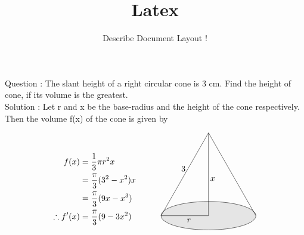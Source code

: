 \documentclass{beamer}
\title{Latex}
\subtitle{Describe Document Layout !}
\begin{document}
 


\frame {
		\titlepage
	}












\frame
{
\section{ }
Question : The slant height of a right circular cone is 3 cm. Find the height of cone, if its volume is the greatest.\\
\vspace{0.4cm}
Solution : Let  r  and x  be the base-radius and the height of the cone respectively. Then the volume f(x) of the cone is given by

\begin{equation} \nonumber
\begin{alignedat}{4}
f(x) &= \frac{1}{3}\pi r^2x\\
&= \frac{\pi}{3}(3^2-x^2)x\\
&= \frac{\pi}{3}(9x - x^3)\\
\therefore f'(x) &=  \frac{\pi}{3}(9 - 3x^2)\\
\end{alignedat}
\quad\quad\quad
\begin{alignedat}{4}
\begin{tikzpicture}
\filldraw[fill=gray!20](0,0) ellipse (2cm and 0.6cm);
\draw (0,0) -- node[below] {\ \ \ $x$}(0,3.5);
\draw (0,0)  -- node[below] {\ \ \ $r$} (-2,0);
\draw  (-2,0) --node[above] {3\ \ }(0,3.5);
\draw  (2,0) -- (0,3.5);
\end{tikzpicture}\\\\
\end{alignedat}
\end{equation}
}
\end{document}
